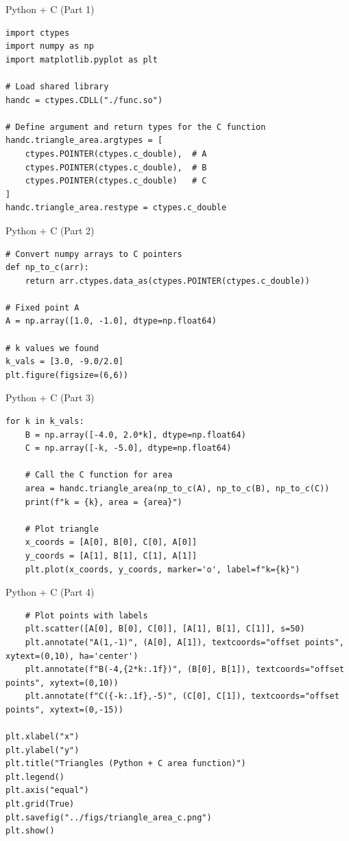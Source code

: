 \documentclass{beamer}
\begin{document}
\begin{frame}[fragile]{Python + C (Part 1)}
\begin{lstlisting}
import ctypes
import numpy as np
import matplotlib.pyplot as plt

# Load shared library
handc = ctypes.CDLL("./func.so")

# Define argument and return types for the C function
handc.triangle_area.argtypes = [
    ctypes.POINTER(ctypes.c_double),  # A
    ctypes.POINTER(ctypes.c_double),  # B
    ctypes.POINTER(ctypes.c_double)   # C
]
handc.triangle_area.restype = ctypes.c_double
\end{lstlisting}
\end{frame}

\begin{frame}[fragile]{Python + C (Part 2)}
\begin{lstlisting}
# Convert numpy arrays to C pointers
def np_to_c(arr):
    return arr.ctypes.data_as(ctypes.POINTER(ctypes.c_double))

# Fixed point A
A = np.array([1.0, -1.0], dtype=np.float64)

# k values we found
k_vals = [3.0, -9.0/2.0]
plt.figure(figsize=(6,6))
\end{lstlisting}
\end{frame}

\begin{frame}[fragile]{Python + C (Part 3)}
\begin{lstlisting}
for k in k_vals:
    B = np.array([-4.0, 2.0*k], dtype=np.float64)
    C = np.array([-k, -5.0], dtype=np.float64)
    
    # Call the C function for area
    area = handc.triangle_area(np_to_c(A), np_to_c(B), np_to_c(C))
    print(f"k = {k}, area = {area}")
    
    # Plot triangle
    x_coords = [A[0], B[0], C[0], A[0]]
    y_coords = [A[1], B[1], C[1], A[1]]
    plt.plot(x_coords, y_coords, marker='o', label=f"k={k}")
\end{lstlisting}
\end{frame}

\begin{frame}[fragile]{Python + C (Part 4)}
\begin{lstlisting}
    # Plot points with labels
    plt.scatter([A[0], B[0], C[0]], [A[1], B[1], C[1]], s=50)
    plt.annotate("A(1,-1)", (A[0], A[1]), textcoords="offset points", xytext=(0,10), ha='center')
    plt.annotate(f"B(-4,{2*k:.1f})", (B[0], B[1]), textcoords="offset points", xytext=(0,10))
    plt.annotate(f"C({-k:.1f},-5)", (C[0], C[1]), textcoords="offset points", xytext=(0,-15))

plt.xlabel("x")
plt.ylabel("y")
plt.title("Triangles (Python + C area function)")
plt.legend()
plt.axis("equal")
plt.grid(True)
plt.savefig("../figs/triangle_area_c.png")
plt.show()
\end{lstlisting}
\end{frame}
\end{document}
